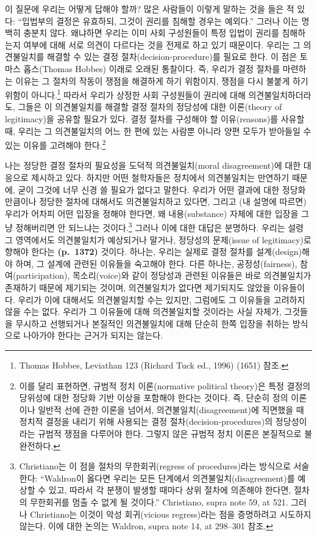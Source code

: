 \documentclass[a4paper,12pt,oneside]{article}  %
\begin{document}
이 질문에 우리는 어떻게 답해야 할까? 많은 사람들이 이렇게 말하는 것을
들은 적 있다: ``입법부의 결정은 유효하되, 그것이 권리를 침해할 경우는
예외다.'' 그러나 이는 명백히 충분치 않다. 왜냐하면 우리는 이미 사회
구성원들이 특정 입법이 권리를 침해하는지 여부에 대해 서로 의견이
다르다는 것을 전제로 하고 있기 때문이다. 우리는 그 의견불일치를 해결할
수 있는 결정 절차(decision-procedure)를 필요로 한다. 이 점은 토마스
홉스(Thomas Hobbes) 이래로 오래된 통찰이다. 즉, 우리가 결정 절차를
마련하는 이유는 그 절차의 작동이 쟁점을 해결하게 하기 위함이지, 쟁점을
다시 불붙게 하기 위함이 아니다.\footnote{Thomas Hobbes, Leviathan 123
  (Richard Tuck ed., 1996) (1651) 참조.} 따라서 우리가 상정한 사회
구성원들이 권리에 대해 의견불일치하더라도, 그들은 이 의견불일치를 해결할
결정 절차의 정당성에 대한 이론(theory of legitimacy)을 공유할 필요가
있다. 결정 절차를 구성해야 할 이유(reasons)를 사유할 때, 우리는 그
의견불일치의 어느 한 편에 있는 사람뿐 아니라 양편 모두가 받아들일 수
있는 이유를 고려해야 한다.\footnote{이를 달리 표현하면, 규범적 정치
  이론(normative political theory)은 특정 결정의 당위성에 대한 정당화
  기반 이상을 포함해야 한다는 것이다. 즉, 단순히 정의 이론이나 일반적
  선에 관한 이론을 넘어서, 의견불일치(disagreement)에 직면했을 때 정치적
  결정을 내리기 위해 사용되는 결정 절차(decision-procedures)의
  정당성이라는 규범적 쟁점을 다루어야 한다. 그렇지 않은 규범적 정치
  이론은 본질적으로 불완전하다.}

나는 정당한 결정 절차의 필요성을 도덕적 의견불일치(moral disagreement)에
대한 대응으로 제시하고 있다. 하지만 어떤 철학자들은 정치에서
의견불일치는 만연하기 때문에, 굳이 그것에 너무 신경 쓸 필요가 없다고
말한다. 우리가 어떤 결과에 대한 정당화만큼이나 정당한 절차에 대해서도
의견불일치하고 있다면, 그리고 (내 설명에 따르면) 우리가 어차피 어떤
입장을 정해야 한다면, 왜 내용(substance) 자체에 대한 입장을 그냥
정해버리면 안 되느냐는 것이다.\footnote{Christiano는 이 점을 절차의
  무한회귀(regress of procedures)라는 방식으로 서술한다: ``Waldron이
  옳다면 우리는 모든 단계에서 의견불일치(disagreement)를 예상할 수 있고,
  따라서 각 분쟁이 발생할 때마다 상위 절차에 의존해야 한다면, 절차의
  무한회귀를 멈출 수 없게 될 것이다.'' Christiano, supra note 59, at
  521. 그러나 Christiano는 이것이 악성 회귀(vicious regress)라는 점을
  증명하려고 시도하지 않는다. 이에 대한 논의는 Waldron, supra note 14,
  at 298--301 참조.} 그러나 이에 대한 대답은 분명하다. 우리는 설령 그
영역에서도 의견불일치가 예상되거나 말거나, 정당성의 문제(issue of
legitimacy)로 향해야 한다는 \textbf{(p.~1372)} 것이다. 하나는, 우리는
실제로 결정 절차를 설계(design)해야 하며, 그 설계에 관련된 이유들을
숙고해야 한다. 다른 하나는, 공정성(fairness), 참여(participation),
목소리(voice)와 같이 정당성과 관련된 이유들은 바로 의견불일치가 존재하기
때문에 제기되는 것이며, 의견불일치가 없다면 제기되지도 않았을
이유들이다. 우리가 이에 대해서도 의견불일치할 수는 있지만, 그럼에도 그
이유들을 고려하지 않을 수는 없다. 우리가 그 이유들에 대해 의견불일치할
것이라는 사실 자체가, 그것들을 무시하고 선행되거나 본질적인 의견불일치에
대해 단순히 한쪽 입장을 취하는 방식으로 나아가야 한다는 근거가 되지는
않는다.
\end{document}
